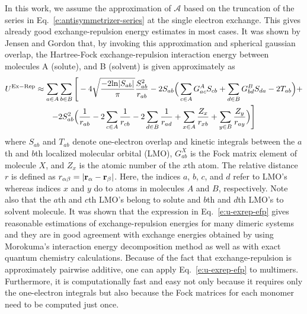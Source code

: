 \documentclass[a4paper,titlepage,twoside,fleqn,12pt]{book}
\begin{document}
\begin{refsection}
In this work, we assume the approximation of $\mathscr{A}$
based on the truncation of the series in Eq.~\eqref{e:antisymmetrizer-series}
at the single electron exchange. This gives already good exchange\hyp{}repulsion
energy estimates in most cases. It was shown by 
Jensen and Gordon\citep{Jensen.Gordon.JCP.1998,Jensen.Gordon.MolPhys.1996}
that, by invoking this
approximation and spherical gaussian overlap\citep{Jensen.JCP.1996}, 
the Hartree\hyp{}Fock exchange\hyp{}repulsion interaction energy 
between molecules A (solute), and B (solvent) is given approximately as 
%
\begin{multline}\label{e:u-exrep-efp}
U^{\rm Ex-Rep} \approx \sum_{a \in A}\sum_{b \in B} \Bigg[
-4\sqrt{\frac{-2{\rm ln}|S_{ab}|}{\pi}} \frac{S_{ab}^2}{r_{ab}} 
-
2S_{ab} \Big( \sum_{c \in A} G^A_{ac} S_{cb} + 
\sum_{d \in B} G^B_{bd} S_{da} - 2 T_{ab} \Big) + \\
-2S^2_{ab} \Big( \frac{1}{r_{ab}} 
- 2\sum_{c \in A} \frac{1}{r_{cb}} 
- 2\sum_{d \in B} \frac{1}{r_{ad}}
+ \sum_{x \in A} \frac{Z_x}{r_{xb}} 
+ \sum_{y \in B} \frac{Z_y}{r_{ay}}  
\Big)
\Bigg]
\end{multline}
%
where $S_{ab}$ and $T_{ab}$ denote one\hyp{}electron overlap and kinetic integrals 
between the $a$th and $b$th localized molecular orbital (LMO), 
$G^X_{ab}$ is the Fock matrix element of molecule 
$X$, and $Z_x$ is the atomic number of the $x$th atom. 
The relative distance $r$ is defined as $r_{\alpha\beta} = \left|{\bf r}_\alpha - {\bf r}_\beta \right|$. 
Here, the indices $a$, $b$, $c$, and $d$ refer to LMO's whereas indices $x$ and $y$ 
do to atoms in molecules $A$ and $B$, respectively. Note also that the $a$th 
and $c$th LMO's belong to solute and $b$th and $d$th LMO's to solvent molecule. 
It was shown\citep{Jensen.Gordon.JCP.1998,Jensen.Gordon.MolPhys.1996,Kemp.Rintelman.Gordon.Jensen.TheoretChemAcc.2009} 
that the expression in Eq.~\eqref{e:u-exrep-efp} gives reasonable 
estimations of exchange\hyp{}repulsion energies for many dimeric systems 
and they are in good agreement with exchange energies obtained 
by using Morokuma's interaction energy decomposition 
method\citep{Kitaura.Morokuma.IJQC.1976} 
as well as 
with exact quantum chemistry calculations. Because of the fact that 
exchange\hyp{}repulsion is approximately pairwise 
additive,\citep{Chen.Li.JPCA.2010,Chen.Gordon.JCP.1996,Jens.Bruske.Grimme.PCCP.2009,
Gora.Sokalski.Leszczynski.Pett.JPCB.2005,Chaudret.Gresh.Parisel.Piquemel.JCC.2011} 
one can 
apply Eq.~\eqref{e:u-exrep-efp} to multimers. Furthermore, it is computationally fast 
and easy not only because it requires only the one\hyp{}electron integrals 
but also because the Fock matrices for each monomer need to be computed just once.


\end{refsection}
\end{document}
